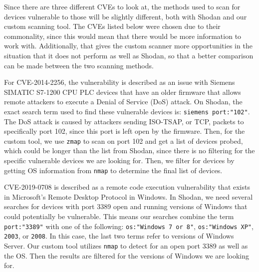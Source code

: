 Since there are three different CVEs to look at, the methods used to scan
for devices vulnerable to those will be slightly different, both with
Shodan and our custom scanning tool. The CVEs listed below were chosen due 
to their commonality, since this would mean that there would be more 
information to work with. Additionally, that gives the custom scanner more 
opportunities in the situation that it does not perform as well as Shodan, 
so that a better comparison can be made between the two scanning methods.

For CVE-2014-2256, the vulnerability is described as an issue with Siemens
SIMATIC S7-1200 CPU PLC devices that have an older firmware that allows remote
attackers to execute a Denial of Service (DoS) attack\cite{CVE-2014-2256}. On Shodan, the exact
search term used to find these vulnerable devices is: \verb|siemens port:"102"|.
The DoS attack is caused by attackers sending ISO-TSAP, or TCP, packets to
specifically port 102, since this port is left open by the firmware. Then, for
the custom tool, we use \verb|zmap| to scan on port 102 and get a list of devices
probed, which could be longer than the list from Shodan, since there is no
filtering for the specific vulnerable devices we are looking for. Then, we filter
for devices by getting OS information from \verb|nmap| to determine the final
list of devices.

CVE-2019-0708 is described as a remote code execution vulnerability that
exists in Microsoft's Remote Desktop Protocol in Windows\cite{CVE-2019-0708}. In Shodan, we need
several searches for devices with port 3389 open and running versions of 
Windows that could potentially be vulnerable. This means our searches combine
the term \verb|port:"3389"| with one of the following: \verb|os:"Windows 7 or 8"|,
\verb|os:"Windows XP"|, \verb|2003|, or \verb|2008|. In this case, the last two
terms refer to versions of Windows Server. Our custom tool utilizes \verb|nmap|
to detect for an open port 3389 as well as the OS. Then the results are filtered
for the versions of Windows we are looking for.

